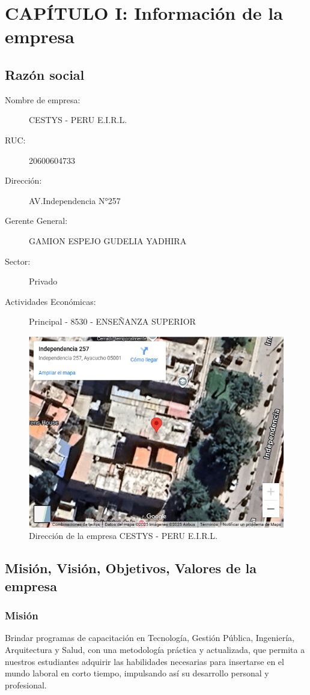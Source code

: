 \section{CAPÍTULO I: Información de la empresa}

\subsection{Razón social}

\begin{description}
	\item[Nombre de empresa:] CESTYS - PERU E.I.R.L.
	\item[RUC:] 20600604733
	\item[Dirección:] AV.Independencia  N°257 
	\item[Gerente General:] GAMION ESPEJO GUDELIA YADHIRA
	\item[Sector:] Privado
	\item[Actividades Económicas:] Principal - 8530 - ENSEÑANZA SUPERIOR
\end{description}
\begin{figure}
	\centering
	\includegraphics[width=0.7\linewidth]{Figuras/11-08-08-2025-11}
	\caption{Dirección de la empresa CESTYS - PERU E.I.R.L.}
	\label{fig:11-08-08-2025-11}
\end{figure}



\subsection{Misión, Visión, Objetivos, Valores de la empresa}


\subsubsection{Misión}
Brindar programas de capacitación en Tecnología, Gestión Pública, Ingeniería, Arquitectura y Salud, con una metodología práctica y actualizada, que permita a nuestros estudiantes adquirir las habilidades necesarias para insertarse en el mundo laboral en corto tiempo, impulsando así su desarrollo personal y profesional.

